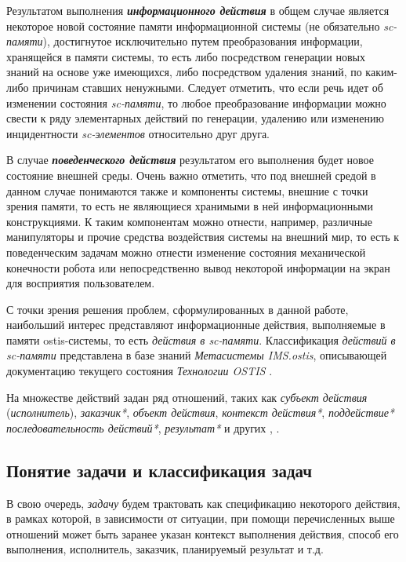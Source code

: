 Результатом выполнения \textbf{\textit{информационного действия}} в общем случае является некоторое новой состояние памяти информационной системы (не обязательно \textit{sc-памяти}), достигнутое исключительно путем преобразования информации, хранящейся в памяти системы, то есть либо посредством генерации новых знаний на основе уже имеющихся, либо посредством удаления знаний, по каким-либо причинам ставших ненужными. Следует отметить, что если речь идет об изменении состояния \textit{sc-памяти}, то любое преобразование информации можно свести к ряду элементарных действий по генерации, удалению или изменению инцидентности \textit{sc-элементов} относительно друг друга.

В случае \textbf{\textit{поведенческого действия}} результатом его выполнения будет новое состояние внешней среды. Очень важно отметить, что под внешней средой в данном случае понимаются также и компоненты системы, внешние с точки зрения памяти, то есть не являющиеся хранимыми в ней информационными конструкциями. К таким компонентам можно отнести, например, различные манипуляторы и прочие средства воздействия системы на внешний мир, то есть к поведенческим задачам можно отнести изменение состояния механической конечности робота или непосредственно вывод некоторой информации на экран для восприятия пользователем.

С точки зрения решения проблем, сформулированных в данной работе, наибольший интерес представляют информационные действия, выполняемые в памяти ostis-системы, то есть \textit{действия в sc-памяти}. Классификация \textit{действий в sc-памяти} представлена в базе знаний \textit{Метасистемы IMS.ostis}, описывающей документацию текущего состояния \textit{Технологии OSTIS} \cite{IMS}.

На множестве действий задан ряд отношений, таких как \textit{субъект действия\scnrolesign} (\textit{исполнитель\scnrolesign}), \textit{заказчик*}, \textit{объект действия\scnrolesign}, \textit{контекст действия*}, \textit{поддействие*} \textit{последовательность действий*}, \textit{результат*} и других \cite{Shunkevich2018}, \cite{IMS}.

\subsection{Понятие задачи и классификация задач}
\label{subsec_problem_concept}

В свою очередь, \textit{задачу} будем трактовать как спецификацию некоторого действия, в рамках которой, в зависимости от ситуации, при помощи перечисленных выше отношений может быть заранее указан контекст выполнения действия, способ его выполнения, исполнитель, заказчик, планируемый результат и т.д.

